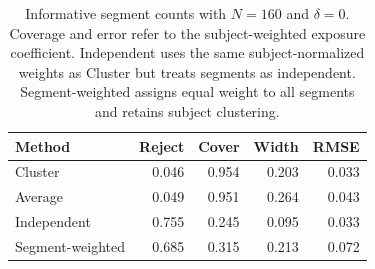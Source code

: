 \begin{table}[htbp]
\centering
\caption{Informative segment counts with $N=160$ and $\delta=0$. Coverage and error refer to the subject-weighted exposure coefficient. Independent uses the same subject-normalized weights as Cluster but treats segments as independent. Segment-weighted assigns equal weight to all segments and retains subject clustering.}\label{tab:counts}
\small
\begin{tabular}{lrrrr}
\toprule
Method & Reject & Cover & Width & RMSE \\
\midrule
Cluster & 0.046 & 0.954 & 0.203 & 0.033 \\
Average & 0.049 & 0.951 & 0.264 & 0.043 \\
Independent & 0.755 & 0.245 & 0.095 & 0.033 \\
Segment-weighted & 0.685 & 0.315 & 0.213 & 0.072 \\
\bottomrule
\end{tabular}
\end{table}
